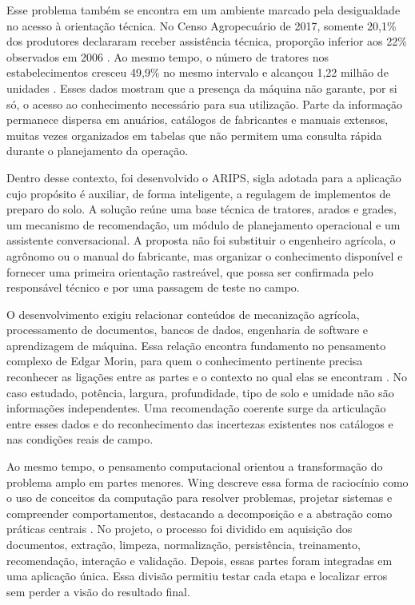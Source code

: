 \documentclass[12pt,a4paper]{article}
\begin{document}
Esse problema também se encontra em um ambiente marcado pela desigualdade no acesso à orientação técnica. No Censo Agropecuário de 2017, somente 20,1\% dos produtores declararam receber assistência técnica, proporção inferior aos 22\% observados em 2006 \cite{ibge2019,ibge2017}. Ao mesmo tempo, o número de tratores nos estabelecimentos cresceu 49,9\% no mesmo intervalo e alcançou 1,22 milhão de unidades \cite{ibge2019}. Esses dados mostram que a presença da máquina não garante, por si só, o acesso ao conhecimento necessário para sua utilização. Parte da informação permanece dispersa em anuários, catálogos de fabricantes e manuais extensos, muitas vezes organizados em tabelas que não permitem uma consulta rápida durante o planejamento da operação.

Dentro desse contexto, foi desenvolvido o ARIPS, sigla adotada para a aplicação cujo propósito é auxiliar, de forma inteligente, a regulagem de implementos de preparo do solo. A solução reúne uma base técnica de tratores, arados e grades, um mecanismo de recomendação, um módulo de planejamento operacional e um assistente conversacional. A proposta não foi substituir o engenheiro agrícola, o agrônomo ou o manual do fabricante, mas organizar o conhecimento disponível e fornecer uma primeira orientação rastreável, que possa ser confirmada pelo responsável técnico e por uma passagem de teste no campo.

O desenvolvimento exigiu relacionar conteúdos de mecanização agrícola, processamento de documentos, bancos de dados, engenharia de software e aprendizagem de máquina. Essa relação encontra fundamento no pensamento complexo de Edgar Morin, para quem o conhecimento pertinente precisa reconhecer as ligações entre as partes e o contexto no qual elas se encontram \cite{morin2000,morin2015}. No caso estudado, potência, largura, profundidade, tipo de solo e umidade não são informações independentes. Uma recomendação coerente surge da articulação entre esses dados e do reconhecimento das incertezas existentes nos catálogos e nas condições reais de campo.

Ao mesmo tempo, o pensamento computacional orientou a transformação do problema amplo em partes menores. Wing descreve essa forma de raciocínio como o uso de conceitos da computação para resolver problemas, projetar sistemas e compreender comportamentos, destacando a decomposição e a abstração como práticas centrais \cite{wing2006}. No projeto, o processo foi dividido em aquisição dos documentos, extração, limpeza, normalização, persistência, treinamento, recomendação, interação e validação. Depois, essas partes foram integradas em uma aplicação única. Essa divisão permitiu testar cada etapa e localizar erros sem perder a visão do resultado final.
\end{document}
